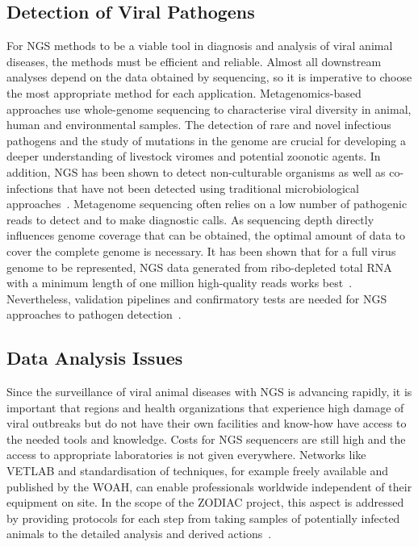 \subsection{Detection of Viral Pathogens}
For NGS methods to be a viable tool in diagnosis and analysis of viral animal diseases, the methods must be efficient and reliable. Almost all downstream analyses depend on the data obtained by sequencing, so it is imperative to choose the most appropriate method for each application. Metagenomics-based approaches use whole-genome sequencing to characterise viral diversity in animal, human and environmental samples. The detection of rare and novel infectious pathogens and the study of mutations in the genome are crucial for developing a deeper understanding of livestock viromes and potential zoonotic agents. In addition, NGS has been shown to detect non-culturable organisms as well as co-infections that have not been detected using traditional microbiological approaches~\cite{cantalupo2019detecting}. Metagenome sequencing often relies on a low number of pathogenic reads to detect and to make diagnostic calls. As sequencing depth directly influences genome coverage that can be obtained, the optimal amount of data to cover the complete genome is necessary. It has been shown that for a full virus genome to be represented, NGS data generated from ribo-depleted total RNA with a minimum length of one million high-quality reads works best~\cite{visser2016next}. Nevertheless, validation pipelines and confirmatory tests are needed for NGS approaches to pathogen detection~\cite{minogue2019next}.


\subsection{Data Analysis Issues}
Since the surveillance of viral animal diseases with NGS is advancing rapidly, it is important that regions and health organizations that experience high damage of viral outbreaks but do not have their own facilities and know-how have access to the needed tools and knowledge. Costs for NGS sequencers are still high and the access to appropriate laboratories is not given everywhere. Networks like VETLAB and standardisation of techniques, for example freely available and published by the WOAH, can enable professionals worldwide independent of their equipment on site. In the scope of the ZODIAC project, this aspect is addressed by providing protocols for each step from taking samples of potentially infected animals to the detailed analysis and derived actions~\cite{zodiac2021}.

